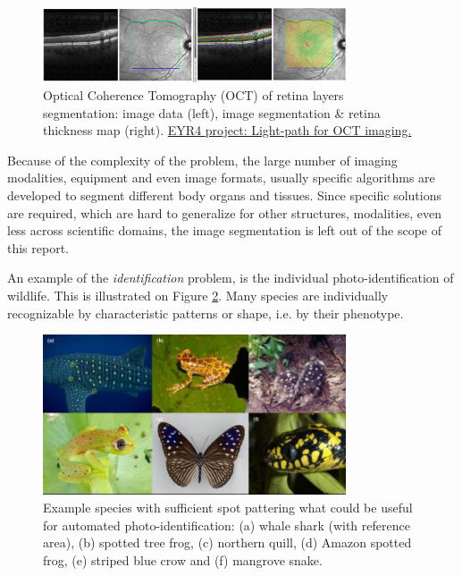 \begin{figure}[H]
\begin{center}
\includegraphics[width=0.8\textwidth]{fig/oct}
\end{center}
\caption{Optical Coherence Tomography (OCT) of retina layers segmentation: image data (left), image segmentation \& retina thickness map (right). \href{https://blog.surf.nl/eyr4-blog-7-lightpath-optical-coherence-tomography-oct-imaging/}{EYR4 project: Light-path for OCT imaging.}}
\label{fig:oct}
\end{figure}

Because of the complexity of the problem, the large number of imaging modalities, equipment and even image formats, usually specific algorithms are developed to segment different body organs and tissues. Since specific solutions are required, which are hard to generalize for other structures, modalities, even less across scientific domains, the image segmentation is left out of the scope of this report.


An example of the {\em identification} problem, is the individual photo-identification of wildlife. This is illustrated on Figure \ref{fig:photoid}. Many species are individually recognizable by characteristic patterns or shape, i.e. by their phenotype.


\begin{figure}[H]
\begin{center}
\includegraphics[width=0.8\textwidth]{fig/photoid}
\end{center}
\caption{Example species with sufficient spot pattering what could be useful for automated photo-identification: (a) whale shark (with reference area),
(b) spotted  tree frog, (c) northern quill, (d) Amazon spotted frog, (e) striped blue crow and (f) mangrove snake.}
\label{fig:photoid}
\end{figure}


